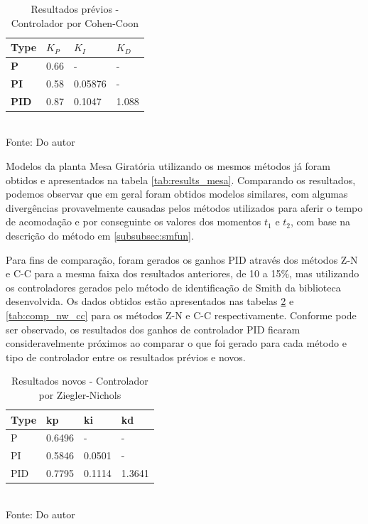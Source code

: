 \begin{table}[H]
    \caption{Resultados prévios - Controlador por Cohen-Coon}
    \centering
    \begin{tabular}{|l|l|l|l|}
        \hline
        \textbf{Type} & \textbf{$K_P$} & \textbf{$K_I$} & \textbf{$K_D$} \\
        \hline
        \textbf{P}    & 0.66           & -              & -              \\
        \hline
        \textbf{PI}   & 0.58           & 0.05876        & -              \\
        \hline
        \textbf{PID}  & 0.87           & 0.1047         & 1.088          \\
        \hline
    \end{tabular}
    \label{tab:comp_prev_cc}
    \\
    \vspace{0cm}\hspace{0cm}\small{Fonte: Do autor}
\end{table}

Modelos da planta Mesa Giratória utilizando os mesmos métodos já foram obtidos e apresentados na tabela
\ref{tab:results_mesa}.
Comparando os resultados, podemos observar que em geral foram obtidos modelos similares, com algumas divergências
provavelmente causadas pelos métodos utilizados para aferir o tempo de acomodação e por conseguinte os valores dos
momentos $t_1$ e $t_2$, com base na descrição do método em \ref{subsubsec:smfun}.

Para fins de comparação, foram gerados os ganhos PID através dos métodos Z-N e C-C para a mesma faixa dos resultados
anteriores, de 10 a 15\%, mas utilizando os controladores gerados pelo método de identificação de Smith da biblioteca
desenvolvida.
Os dados obtidos estão apresentados nas tabelas \ref{tab:comp_nw_zn} e \ref{tab:comp_nw_cc} para os métodos
Z-N e C-C respectivamente.
Conforme pode ser observado, os resultados dos ganhos de controlador PID ficaram consideravelmente próximos ao
comparar o que foi gerado para cada método e tipo de controlador entre os resultados prévios e novos.


\begin{table}[H]
    \caption{Resultados novos - Controlador por Ziegler-Nichols}
    \centering
    \begin{tabular}{|l|l|l|l|}
        \hline
        \textbf{Type} & \textbf{kp} & \textbf{ki} & \textbf{kd} \\
        \hline
        P             & 0.6496      & -           & -           \\
        \hline
        PI            & 0.5846      & 0.0501      & -           \\
        \hline
        PID           & 0.7795      & 0.1114      & 1.3641      \\
        \hline
    \end{tabular}
    \label{tab:comp_nw_zn}
    \\
    \vspace{0cm}\hspace{0cm}\small{Fonte: Do autor}
\end{table}


